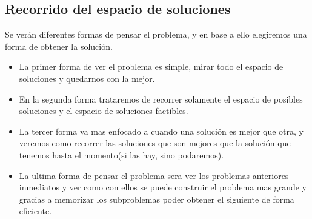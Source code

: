 \subsection{Recorrido del espacio de soluciones}
Se ver\'an diferentes formas de pensar el problema, y en base a ello elegiremos una forma de obtener la soluci\'on.\\

\begin{itemize}
\item La primer forma de ver el problema es simple, mirar todo el espacio de soluciones y quedarnos con la mejor.\\
\item En la segunda forma trataremos de recorrer solamente el espacio de posibles soluciones y el espacio de soluciones factibles.\\
\item La tercer forma va mas enfocado a cuando una soluci\'on es mejor que otra, y veremos como recorrer las soluciones que son mejores que la soluci\'on que tenemos hasta el momento(si las hay, sino podaremos).\\
\item La ultima forma de pensar el problema sera ver los problemas anteriores inmediatos y ver como con ellos se puede construir el problema mas grande y gracias a memorizar los subproblemas poder obtener el siguiente de forma eficiente.
\end{itemize}